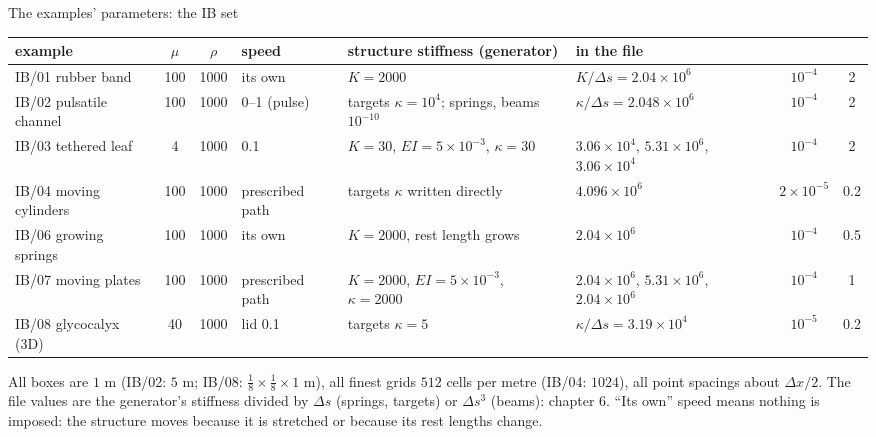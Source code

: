 \documentclass[aspectratio=169,11pt]{beamer}
\begin{document}
\begin{frame}{The examples' parameters: the IB set}
\label{fr:table}
\tiny
\setlength{\tabcolsep}{2pt}
\begin{tabular}{@{}L{0.13\textwidth}ccL{0.1\textwidth}L{0.17\textwidth}L{0.18\textwidth}cc@{}}
\toprule
example & $\mu$ & $\rho$ & speed & structure stiffness (generator) & in the file &  & \\
\midrule
IB/01 rubber band & 100 & 1000 & its own & $K = 2000$ & $K/\Delta s = 2.04\times10^6$ & $10^{-4}$ & 2\\
IB/02 pulsatile channel & 100 & 1000 & 0--1 (pulse) & targets $\kappa = 10^4$; springs, beams $10^{-10}$ & $\kappa/\Delta s = 2.048\times10^6$ & $10^{-4}$ & 2\\
IB/03 tethered leaf & 4 & 1000 & 0.1 & $K = 30$, $EI = 5\times10^{-3}$, $\kappa = 30$ & $3.06\times10^4$, $5.31\times10^6$, $3.06\times10^4$ & $10^{-4}$ & 2\\
IB/04 moving cylinders & 100 & 1000 & prescribed path & targets $\kappa$ written directly & $4.096\times10^6$ & $2\times10^{-5}$ & 0.2\\
IB/06 growing springs & 100 & 1000 & its own & $K = 2000$, rest length grows & $2.04\times10^6$ & $10^{-4}$ & 0.5\\
IB/07 moving plates & 100 & 1000 & prescribed path & $K = 2000$, $EI = 5\times10^{-3}$, $\kappa = 2000$ & $2.04\times10^6$, $5.31\times10^6$, $2.04\times10^6$ & $10^{-4}$ & 1\\
IB/08 glycocalyx (3D) & 40 & 1000 & lid 0.1 & targets $\kappa = 5$ & $\kappa/\Delta s = 3.19\times10^4$ & $10^{-5}$ & 0.2\\
\bottomrule
\end{tabular}

\vspace{2mm}
\small All boxes are $1$ m (IB/02: $5$ m; IB/08: $\frac18\times\frac18\times1$ m), all finest grids $512$ cells per metre (IB/04: $1024$), all point spacings about $\Delta x/2$. The file values are the generator's stiffness divided by $\Delta s$ (springs, targets) or $\Delta s^3$ (beams): chapter 6. ``Its own'' speed means nothing is imposed: the structure moves because it is stretched or because its rest lengths change.
\end{frame}
\end{document}
